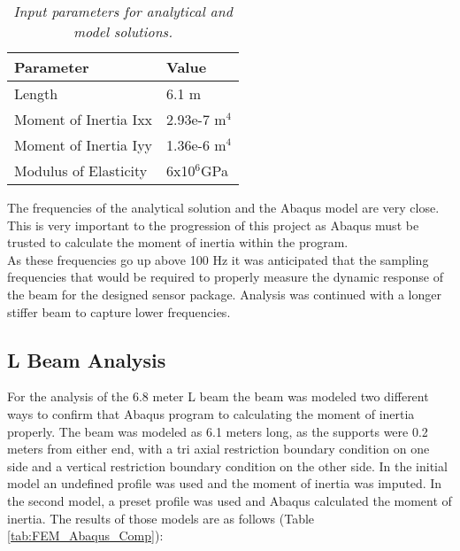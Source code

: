 \begin{table}
    \begin{center}
    \begin{tabular}{|l|l|}
        \hline
        \textbf{Parameter}    & \textbf{Value}     \\ \hline
        Length                & 6.1 m         \\\hline
        Moment of Inertia Ixx & 2.93e-7 m$^4$ \\\hline
        Moment of Inertia Iyy & 1.36e-6 m$^4$ \\\hline
        Modulus of Elasticity & 6x10$^6$GPa      \\\hline
        \end{tabular}
        \caption{\textit{Input parameters for analytical and model solutions.}}
        \label{tab:FEM_inputs}
    \end{center}
\end{table}

\indent The frequencies of the analytical solution and the Abaqus model are very close. This is very important to the progression of this project as Abaqus must be trusted to calculate the moment of inertia within the program. \\
\indent As these frequencies go up above 100 Hz it was anticipated that the sampling frequencies that would be required to properly measure the dynamic response of the beam for the designed sensor package. Analysis was continued with a longer stiffer beam to capture lower frequencies. 

\subsection{L Beam Analysis}
\indent For the analysis of the 6.8 meter L beam the beam was modeled two different ways to confirm that Abaqus program to calculating the moment of inertia properly. The beam was modeled as 6.1 meters long, as the supports were 0.2 meters from either end, with a tri axial restriction boundary condition on one side and a vertical restriction boundary condition on the other side. In the initial model an undefined profile was used and the moment of inertia was imputed. In the second model, a preset profile was used and Abaqus calculated the moment of inertia. The results of those models are as follows (Table \ref{tab:FEM_Abaqus_Comp}):\\

